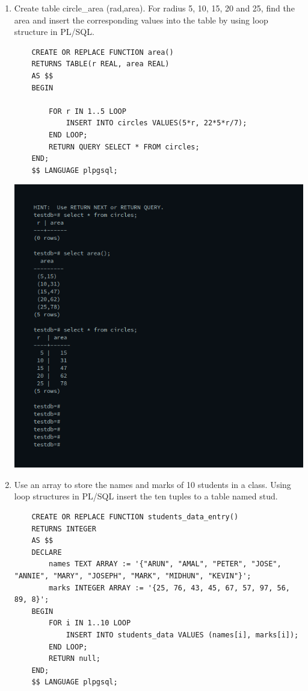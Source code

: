 \documentclass[10pt,a4paper,titlepage]{report}
\begin{document}
{\begin{enumerate}
	\item Create table circle\_area (rad,area). For radius 5, 10, 15, 20 and 25, find the area and insert the corresponding values into the table by using loop structure in PL/SQL.\newline
	\begin{verbatim}
	CREATE OR REPLACE FUNCTION area()
	RETURNS TABLE(r REAL, area REAL)
	AS $$
	BEGIN

		FOR r IN 1..5 LOOP
			INSERT INTO circles VALUES(5*r, 22*5*r/7);
		END LOOP;
		RETURN QUERY SELECT * FROM circles;
	END;
	$$ LANGUAGE plpgsql;
	\end{verbatim}
	\includegraphics[width=\linewidth]{../Images/Plsql/4.png}

	\item Use an array to store the names and marks of 10 students in a class. Using loop structures in PL/SQL insert the ten tuples to a table named stud. \newline
	\begin{verbatim}
	CREATE OR REPLACE FUNCTION students_data_entry()
	RETURNS INTEGER
	AS $$
	DECLARE
		names TEXT ARRAY := '{"ARUN", "AMAL", "PETER", "JOSE", "ANNIE", "MARY", "JOSEPH", "MARK", "MIDHUN", "KEVIN"}';
		marks INTEGER ARRAY := '{25, 76, 43, 45, 67, 57, 97, 56, 89, 8}';
	BEGIN
		FOR i IN 1..10 LOOP
			INSERT INTO students_data VALUES (names[i], marks[i]);
		END LOOP;
		RETURN null;
	END;
	$$ LANGUAGE plpgsql;


\end{verbatim}
\end{enumerate}}
\end{document}
